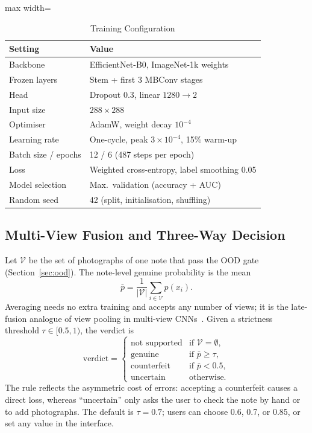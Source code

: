 \documentclass[journal]{IEEEtran}
\begin{document}
\begin{table}[!t]
\caption{Training Configuration}
\label{tab:hyper}
\centering
\footnotesize
\setlength{\tabcolsep}{4pt}
\begin{adjustbox}{max width=\columnwidth}
\begin{tabular}{@{}ll@{}}
\toprule
Setting & Value \\
\midrule
Backbone & EfficientNet-B0, ImageNet-1k weights \\
Frozen layers & Stem + first 3 MBConv stages \\
Head & Dropout 0.3, linear $1280\rightarrow2$ \\
Input size & $288\times288$ \\
Optimiser & AdamW, weight decay $10^{-4}$ \\
Learning rate & One-cycle, peak $3\times10^{-4}$, 15\% warm-up \\
Batch size / epochs & 12 / 6 (487 steps per epoch) \\
Loss & Weighted cross-entropy, label smoothing 0.05 \\
Model selection & Max.\ validation (accuracy + AUC) \\
Random seed & 42 (split, initialisation, shuffling) \\
\bottomrule
\end{tabular}
\end{adjustbox}
\end{table}

\subsection{Multi-View Fusion and Three-Way Decision}
\label{sec:decision}
Let $\mathcal{V}$ be the set of photographs of one note that pass the OOD gate
(Section~\ref{sec:ood}). The note-level genuine probability is the mean
\begin{equation}
\bar{p} = \frac{1}{|\mathcal{V}|}\sum_{i\in\mathcal{V}} p(x_i).
\label{eq:fusion}
\end{equation}
Averaging needs no extra training and accepts any number of views; it is the late-fusion
analogue of view pooling in multi-view CNNs~\cite{su2015mvcnn}. Given a strictness threshold $\tau\in[0.5,1)$, the verdict is
\begin{equation}
\text{verdict} =
\begin{cases}
\text{not supported} & \text{if } \mathcal{V}=\emptyset,\\
\text{genuine} & \text{if } \bar{p}\ge\tau,\\
\text{counterfeit} & \text{if } \bar{p}<0.5,\\
\text{uncertain} & \text{otherwise.}
\end{cases}
\label{eq:decision}
\end{equation}
The rule reflects the asymmetric cost of errors: accepting a counterfeit causes a direct
loss, whereas ``uncertain'' only asks the user to check the note by hand or to add
photographs. The default
is $\tau=0.7$; users can choose 0.6, 0.7, or 0.85, or set any value in the interface.
\end{document}
